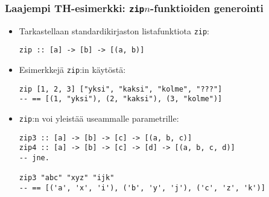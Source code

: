 \documentclass{beamer}
\begin{document}
\begin{comment}
compileTimeEval :: Integer -> Q Exp
compileTimeEval i = litE (integerL i)
\end{verbatim}

\item{Esimerkki \texttt{compileTimeEval}-makron käytöstä}
\begin{verbatim}
{-# LANGUAGE TemplateHaskell #-}
module Main where
import THExample (compileTimeEval)

main = do
    print (2 * $(compileTimeEval (sum [1..1000000])))
    print $(compileTimeEval (1 `div` 0))
\end{verbatim}
\end{itemize}
\end{frame}

\end{comment}

\begin{frame}[fragile]
\frametitle{Laajempi TH-esimerkki: \texttt{zip$n$}-funktioiden generointi}

\begin{itemize}
\item{Tarkastellaan standardikirjaston listafunktiota \texttt{zip}:}
\begin{verbatim}
zip :: [a] -> [b] -> [(a, b)]
\end{verbatim}
\item{Esimerkkejä \texttt{zip}:in käytöstä:}
\begin{verbatim}
zip [1, 2, 3] ["yksi", "kaksi", "kolme", "???"]
-- == [(1, "yksi"), (2, "kaksi"), (3, "kolme")]
\end{verbatim}

\item{\texttt{zip}:n voi yleistää useammalle parametrille:}
\begin{verbatim}
zip3 :: [a] -> [b] -> [c] -> [(a, b, c)]
zip4 :: [a] -> [b] -> [c] -> [d] -> [(a, b, c, d)]
-- jne.

zip3 "abc" "xyz" "ijk"
-- == [('a', 'x', 'i'), ('b', 'y', 'j'), ('c', 'z', 'k')]
\end{verbatim}
\end{itemize}

\end{frame}
\end{document}
